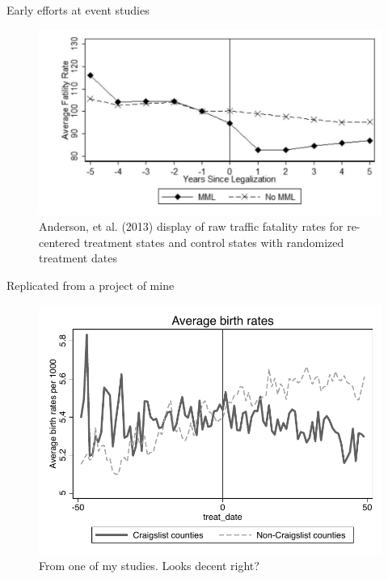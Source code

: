 \documentclass{beamer}
\begin{document}
\begin{frame}{Early efforts at event studies}

	\begin{figure}
	\includegraphics[scale=0.25]{./lecture_includes/mml_eventstudy.png}
	\caption{Anderson, et al. (2013) display of raw traffic fatality rates for re-centered treatment states and control states with randomized treatment dates}
	\end{figure}

\end{frame}

\begin{frame}{Replicated from a project of mine}

	\begin{figure}
	\includegraphics[scale=0.5]{./lecture_includes/dd.pdf}
	\caption{From one of my studies. Looks decent right?}
	\end{figure}

\end{frame}
\end{document}

